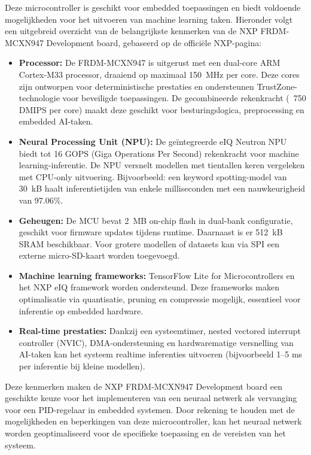 Deze microcontroller is geschikt voor embedded toepassingen en biedt voldoende mogelijkheden voor het uitvoeren van machine learning taken. Hieronder volgt een uitgebreid overzicht van de belangrijkste kenmerken van de NXP FRDM-MCXN947\cite{NXP2025_datasheet} Development board, gebaseerd op de officiële NXP-pagina:
\begin{itemize}
  \item \textbf{Processor:} De FRDM-MCXN947\cite{NXP2025_datasheet} is uitgerust met een dual-core ARM Cortex-M33 processor, draaiend op maximaal 150~MHz per core. Deze cores zijn ontworpen voor deterministische prestaties en ondersteunen TrustZone-technologie voor beveiligde toepassingen. De gecombineerde rekenkracht (~750 DMIPS per core) maakt deze geschikt voor besturingslogica, preprocessing en embedded AI-taken.
  \item \textbf{Neural Processing Unit (NPU):} De geïntegreerde eIQ Neutron NPU biedt tot 16 GOPS (Giga Operations Per Second) rekenkracht voor machine learning-inferentie. De NPU versnelt modellen met tientallen keren vergeleken met CPU-only uitvoering. Bijvoorbeeld: een keyword spotting-model van 30~kB haalt inferentietijden van enkele milliseconden met een nauwkeurigheid van 97.06\%.
  \item \textbf{Geheugen:} De MCU bevat 2~MB on-chip flash in dual-bank configuratie, geschikt voor firmware updates tijdens runtime. Daarnaast is er 512~kB SRAM beschikbaar. Voor grotere modellen of datasets kan via SPI een externe micro-SD-kaart worden toegevoegd.
  \item \textbf{Machine learning frameworks:} TensorFlow Lite for Microcontrollers en het NXP eIQ framework worden ondersteund. Deze frameworks maken optimalisatie via quantisatie, pruning en compressie mogelijk, essentieel voor inferentie op embedded hardware.
  \item \textbf{Real-time prestaties:} Dankzij een systeemtimer, nested vectored interrupt controller (NVIC), DMA-ondersteuning en hardwarematige versnelling van AI-taken kan het systeem realtime inferenties uitvoeren (bijvoorbeeld 1--5 ms per inferentie bij kleine modellen).
\end{itemize}
Deze kenmerken maken de NXP FRDM-MCXN947 Development board een geschikte keuze voor het implementeren van een neuraal netwerk als vervanging voor een PID-regelaar in embedded systemen. Door rekening te houden met de mogelijkheden en beperkingen van deze microcontroller, kan het neuraal netwerk worden geoptimaliseerd voor de specifieke toepassing en de vereisten van het systeem.


